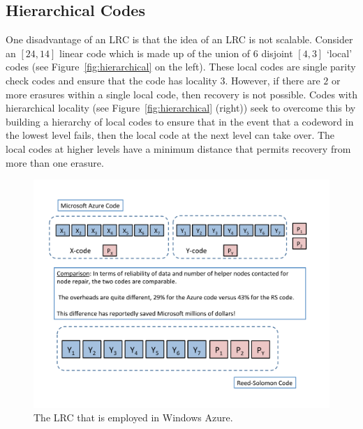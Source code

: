 \begin{multicols}{2}
\subsection{Hierarchical Codes} 	

One disadvantage of an LRC is that the idea of an LRC is not scalable. Consider an $[24,14]$ linear code which is made up of the union of $6$ disjoint $[4,3]$ `local' codes (see Figure~\ref{fig:hierarchical} on the left).  These local codes are single parity check codes and ensure that the code has locality $3$.  However, if there are $2$ or more erasures within a single local code, then recovery is not possible.  Codes with hierarchical locality \cite{SasAgaKum_loc} (see Figure~\ref{fig:hierarchical} (right)) seek to overcome this by building a hierarchy of local codes to ensure that in the event that a codeword in the lowest level fails, then the local code at the next level can take over.  The local codes at higher levels have a minimum distance that permits recovery from more than one erasure.
\end{multicols}

	\begin{figure}[h!]
		\centering
		\includegraphics[scale=.52]{src/Figures/chap4/Azure}  
		\caption{The LRC that is employed in Windows Azure.}  \label{fig:Azure}    
	\end{figure}      

\medskip

